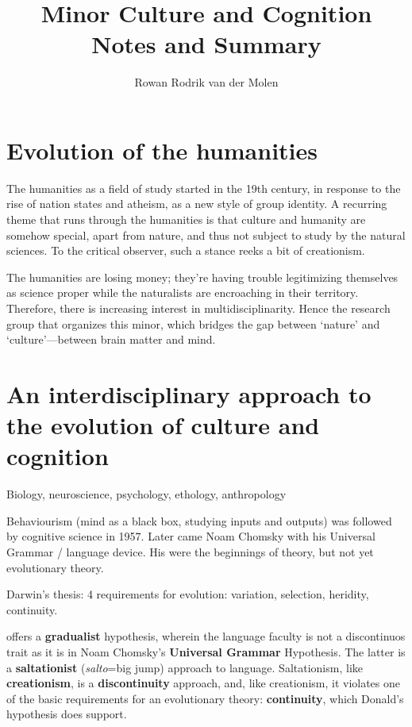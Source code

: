 \documentclass{article}
\title{Minor Culture and Cognition\\Notes and Summary}
\author{Rowan Rodrik van der Molen}
\begin{document}
\maketitle

\tableofcontents

\section{Evolution of the humanities}

The humanities as a field of study started in the 19th century, in response to
the rise of nation states and atheism, as a new style of group identity.  A
recurring theme that runs through the humanities is that culture and humanity
are somehow special, apart from nature, and thus not subject to study by the
natural sciences. To the critical observer, such a stance reeks a bit of
creationism.

The humanities are losing money; they're having trouble legitimizing themselves
as science proper while the naturalists are encroaching in their territory.
Therefore, there is increasing interest in multidisciplinarity. Hence the
research group that organizes this minor, which bridges the gap between
‘nature’ and ‘culture’---between brain matter and mind.


\citet{mesoudi2006}


\section{An interdisciplinary approach to the evolution of culture and cognition}

Biology, neuroscience, psychology, ethology, anthropology

Behaviourism (mind as a black box, studying inputs and outputs) was followed by cognitive science in 1957. Later came Noam Chomsky with his Universal Grammar / language device. His were the beginnings of theory, but not yet evolutionary theory.

Darwin's thesis: 4 requirements for evolution: variation, selection, heridity, continuity.

\citet{donald1991} offers a \textbf{gradualist} hypothesis, wherein the language faculty is not a discontinuos trait as it is in Noam Chomsky's \textbf{Universal Grammar} Hypothesis. The latter is a \textbf{saltationist} (\textit{salto}=big jump) approach to language. Saltationism, like \textbf{creationism}, is a \textbf{discontinuity} approach, and, like creationism, it violates one of the basic requirements for an evolutionary theory: \textbf{continuity}, which Donald's hypothesis does support.
\end{document}
